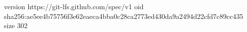 version https://git-lfs.github.com/spec/v1
oid sha256:ae5ee4b75756f3e62eaeca4bba0c28ca2773ed430da9a2494d22cfd7c89cc435
size 302
